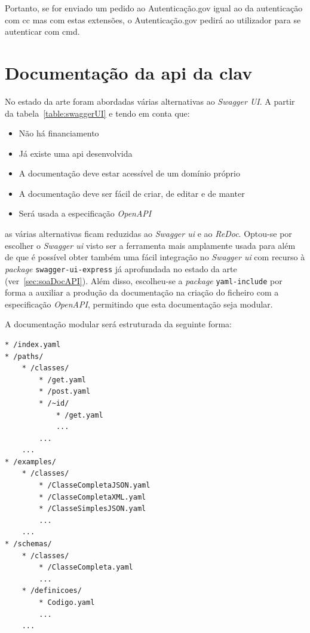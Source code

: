 Portanto, se for enviado um pedido ao Autenticação.gov igual ao da autenticação com \acrshort{cc} mas com estas extensões, o Autenticação.gov pedirá ao utilizador para se autenticar com \acrshort{cmd}.

\section{Documentação da \acrshort{api} da \acrshort{clav}}

No estado da arte foram abordadas várias alternativas ao \textit{Swagger UI}. A partir da tabela~\ref{table:swaggerUI} e tendo em conta que:
\begin{itemize}
    \item Não há financiamento
    \item Já existe uma \acrshort{api} desenvolvida
    \item A documentação deve estar acessível de um domínio próprio
    \item A documentação deve ser fácil de criar, de editar e de manter
    \item Será usada a especificação \textit{OpenAPI}
\end{itemize}

as várias alternativas ficam reduzidas ao \textit{Swagger \acrshort{ui}} e ao \textit{ReDoc}. Optou-se por escolher o \textit{Swagger \acrshort{ui}} visto ser a ferramenta mais amplamente usada para além de que é possível obter também uma fácil integração no \textit{Swagger \acrshort{ui}} com recurso à \textit{package} \texttt{swagger-ui-express} já aprofundada no estado da arte (ver~\ref{sec:soaDocAPI}). Além disso, escolheu-se a \textit{package} \texttt{yaml-include} por forma a auxiliar a produção da documentação na criação do ficheiro com a especificação \textit{OpenAPI}, permitindo que esta documentação seja modular.

A documentação modular será estruturada da seguinte forma:

\begin{lstlisting}[caption=Excerto da estrutura modular da documentação]
* /index.yaml
* /paths/
    * /classes/
        * /get.yaml
        * /post.yaml
        * /~id/
            * /get.yaml
            ...
        ...
    ...
* /examples/
    * /classes/
        * /ClasseCompletaJSON.yaml
        * /ClasseCompletaXML.yaml
        * /ClasseSimplesJSON.yaml
        ...
    ...
* /schemas/
    * /classes/
        * /ClasseCompleta.yaml
        ...
    * /definicoes/
        * Codigo.yaml
        ...
    ...
\end{lstlisting}

